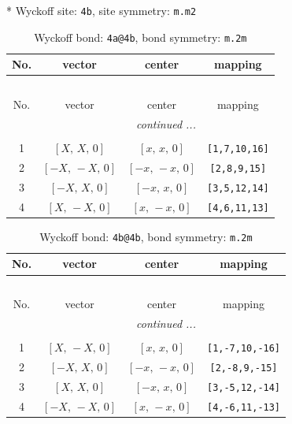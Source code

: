 \documentclass[fleqn,8pt]{jsarticle}
\begin{document}
* Wyckoff site: {\tt 4b}, site symmetry: {\tt m.m2}
\renewcommand{\arraystretch}{1.2}
\begin{longtable}{cccc}
\caption{Wyckoff bond: {\tt 4a@4b}, bond symmetry: {\tt m.2m}}
 \\
 \hline \hline
No. & vector & center & mapping \\ \hline \endfirsthead

\multicolumn{3}{l}{\tablename\ \thetable{}} \\
 \hline \hline
No. & vector & center & mapping \\ \hline \endhead

 \hline \hline
\multicolumn{3}{r}{\footnotesize\it continued ...} \\ \endfoot

 \hline \hline
\multicolumn{3}{r}{} \\ \endlastfoot

1 & $\left[ X,\, X,\, 0 \right]$ & $\left[ x,\, x,\, 0 \right]$ & {\tt [1,7,10,16]} \\ \hline
2 & $\left[ - X,\, - X,\, 0 \right]$ & $\left[ - x,\, - x,\, 0 \right]$ & {\tt [2,8,9,15]} \\ \hline
3 & $\left[ - X,\, X,\, 0 \right]$ & $\left[ - x,\, x,\, 0 \right]$ & {\tt [3,5,12,14]} \\ \hline
4 & $\left[ X,\, - X,\, 0 \right]$ & $\left[ x,\, - x,\, 0 \right]$ & {\tt [4,6,11,13]} \\
\end{longtable}
\renewcommand{\arraystretch}{1.2}
\begin{longtable}{cccc}
\caption{Wyckoff bond: {\tt 4b@4b}, bond symmetry: {\tt m.2m}}
 \\
 \hline \hline
No. & vector & center & mapping \\ \hline \endfirsthead

\multicolumn{3}{l}{\tablename\ \thetable{}} \\
 \hline \hline
No. & vector & center & mapping \\ \hline \endhead

 \hline \hline
\multicolumn{3}{r}{\footnotesize\it continued ...} \\ \endfoot

 \hline \hline
\multicolumn{3}{r}{} \\ \endlastfoot

1 & $\left[ X,\, - X,\, 0 \right]$ & $\left[ x,\, x,\, 0 \right]$ & {\tt [1,-7,10,-16]} \\ \hline
2 & $\left[ - X,\, X,\, 0 \right]$ & $\left[ - x,\, - x,\, 0 \right]$ & {\tt [2,-8,9,-15]} \\ \hline
3 & $\left[ X,\, X,\, 0 \right]$ & $\left[ - x,\, x,\, 0 \right]$ & {\tt [3,-5,12,-14]} \\ \hline
4 & $\left[ - X,\, - X,\, 0 \right]$ & $\left[ x,\, - x,\, 0 \right]$ & {\tt [4,-6,11,-13]} \\
\end{longtable}
\end{document}
